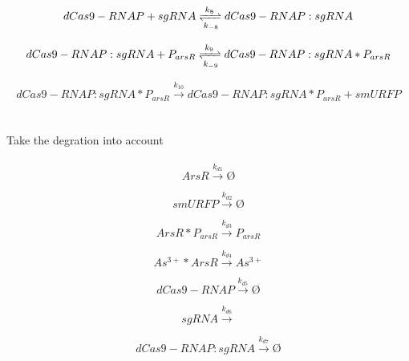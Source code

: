 \begin{equation}
dCas9-RNAP+sgRNA\xrightleftharpoons[k_{-8}]{k_8} dCas9-RNAP:sgRNA
\end{equation}

\begin{equation}
dCas9-RNAP:sgRNA+P_{arsR}\xrightleftharpoons[k_{-9}]{k_9} dCas9-RNAP:sgRNA*P_{arsR}
\end{equation}

\begin{equation}
dCas9-RNAP:sgRNA*P_{arsR}\stackrel{k_{10}}{\longrightarrow} dCas9-RNAP:sgRNA*P_{arsR}+smURFP
\end{equation}
\\\\
Take the degration into account
\\\\
\begin{equation}
ArsR\stackrel{k_{d1}}{\longrightarrow}Ø
\end{equation}

\begin{equation}
smURFP\stackrel{k_{d2}}{\longrightarrow}Ø
\end{equation}


\begin{equation}
ArsR*P_{arsR}\stackrel{k_{d3}}{\longrightarrow}P_{arsR}
\end{equation}

\begin{equation}
As^{3+}*ArsR\stackrel{k_{d4}}{\longrightarrow}As^{3+}
\end{equation}

\begin{equation}
dCas9-RNAP\stackrel{k_{d5}}{\longrightarrow}Ø
\end{equation}

\begin{equation}
sgRNA\stackrel{k_{d6}}{\longrightarrow}
\end{equation}


\begin{equation}
dCas9-RNAP:sgRNA\stackrel{k_{d7}}{\longrightarrow}Ø
\end{equation}


